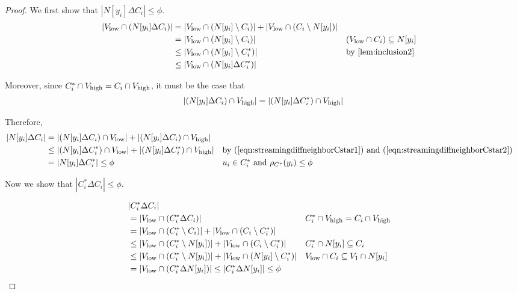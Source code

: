 \begin{proof}
We first show that $|N[y_i] \Delta C_i| \leq \phi$.
\begin{align}
|\Vlow \cap (N[y_i] \Delta C_i)| &= |\Vlow \cap (N[y_i] \setminus C_i)| + |\Vlow \cap (C_i \setminus N[y_i])| \nonumber \\
&= |\Vlow \cap (N[y_i] \setminus C_i)|  && (\Vlow \cap C_i) \subseteq N[y_i]  \nonumber  \\
&\leq |\Vlow \cap (N[y_i] \setminus C^{*}_i)|  && \mbox{by \Cref{lem:inclusion2}}   \nonumber \\
&\leq |\Vlow \cap (N[y_i] \Delta C^{*}_i)|  \label{eqn:streamingdiffneighborCstar1}
\end{align}

Moreover, since $C^{*}_i \cap V_{\operatorname{high}} = C_i \cap V_{\operatorname{high}}$, it must be the case that 
\begin{align}
|(N[y_i] \Delta C_i) \cap V_{\operatorname{high}}| = |(N[y_i] \Delta C^{*}_i) \cap V_{\operatorname{high}}|  \label{eqn:streamingdiffneighborCstar2}
\end{align}

Therefore,
\begin{align*}
|N[y_i] \Delta C_i| &= |(N[y_i] \Delta C_i) \cap V_{\operatorname{low}}| + |(N[y_i] \Delta C_i) \cap V_{\operatorname{high}}| \\
&\leq |(N[y_i] \Delta C^{*}_i) \cap V_{\operatorname{low}}| + |(N[y_i] \Delta C^{*}_i) \cap V_{\operatorname{high}}| && \mbox{by (\ref{eqn:streamingdiffneighborCstar1}) and (\ref{eqn:streamingdiffneighborCstar2})} \\
& = |N[y_i] \Delta C^{*}_i| \leq \phi  && \mbox{$u_i \in C^{*}_i$ and $\rho_{C^{*}}(y_i) \leq \phi$}
\end{align*}

Now we show that $|C^{*}_i \Delta C_{i}| \leq \phi$. 

\begin{align*}
&|C^{*}_i \Delta C_{i}| \\
&= |V_{\operatorname{low}} \cap (C^{*}_i \Delta C_{i})| && C^{*}_i \cap V_{\operatorname{high}} = C_i \cap V_{\operatorname{high}} \\
&= |V_{\operatorname{low}} \cap (C^{*}_i \setminus C_{i})| + |V_{\operatorname{low}} \cap (C_i \setminus C^{*}_{i})| \\
&\leq |V_{\operatorname{low}} \cap (C^{*}_i \setminus N[y_i])| + |V_{\operatorname{low}} \cap (C_i \setminus C^{*}_{i})| && C^{*}_i \cap N[y_i] \subseteq C_i \\
&\leq |V_{\operatorname{low}} \cap (C^{*}_i \setminus N[y_i])| + |V_{\operatorname{low}} \cap (N[y_i] \setminus C^{*}_{i})| && V_{\operatorname{low}} \cap C_i \subseteq V_1 \cap N[y_i] \\
&= |V_{\operatorname{low}} \cap (C^{*}_i \Delta N[y_i])| \leq |C^{*}_i \Delta N[y_i]| \leq \phi
\end{align*}



\end{proof}
